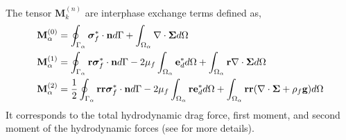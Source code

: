 The tensor $\textbf{M}_k^{(n)}$ are interphase exchange terms defined as, 
\begin{align}
    \textbf{M}_\alpha^{(0)} &=
    \oint_{\Gamma_{\alpha}} \bm{\sigma}_f^* \cdot \textbf{n} d\Gamma
   +\int_{\Omega_{\alpha}} \mathbf{\nabla}\cdot \bm\Sigma d\Omega
   \\
   \textbf{M}_\alpha^{(1)} &=
   \oint_{\Gamma_{\alpha}} \textbf{r}\bm{\sigma}_f^* \cdot \textbf{n} d\Gamma
   -2\mu_f \int_{\Omega_{\alpha}} \textbf{e}_d^* d\Omega
   +\int_{\Omega_{\alpha}} \textbf{r}\mathbf{\nabla}\cdot \bm\Sigma d\Omega
   \\
   \textbf{M}_\alpha^{(2)} &=
   \frac{1}{2}\oint_{\Gamma_{\alpha}} \textbf{rr}\bm{\sigma}_f^* \cdot \textbf{n} d\Gamma
   -2\mu_f \int_{\Omega_{\alpha}} \textbf{re}_d^* d\Omega
   +\int_{\Omega_{\alpha}} \textbf{rr}(\mathbf{\nabla}\cdot \bm\Sigma+ \rho_f\textbf{g}) d\Omega
\end{align}
It corresponds to the total hydrodynamic drag force, first moment, and second moment of the hydrodynamic forces (see \citet{fintzi2024averaged} for more details). 

